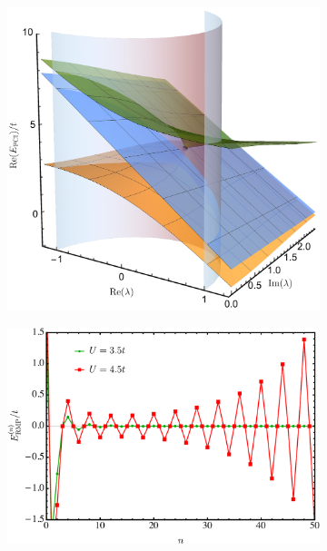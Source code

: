 \documentclass[aps,prb,reprint,noshowkeys,linenumbers,superscriptaddress]{revtex4-1}
\begin{document}
\begin{figure}
	\begin{subfigure}{0.32\textwidth}
	\includegraphics[height=0.75\textwidth]{fig2a}	
    \end{subfigure}
    \begin{subfigure}{0.32\textwidth}
	\includegraphics[height=0.75\textwidth]{fig2b}
		\subcaption{\label{subfig:RMP_cvg}}
    \end{subfigure}
    \begin{subfigure}{0.32\textwidth}

\end{subfigure}
\end{figure}
\end{document}
